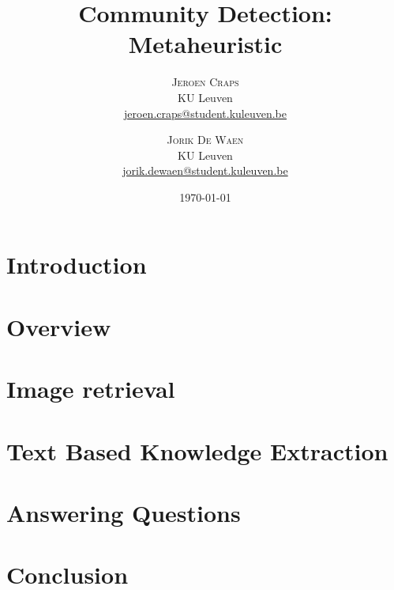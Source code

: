 \documentclass[twoside,twocolumn]{article}
\title{Community Detection: Metaheuristic} %
\author{%
\textsc{Jeroen Craps} \\[1ex] %
\normalsize KU Leuven \\ %
\normalsize \href{mailto:jeroen.craps@student.kuleuven.be}{jeroen.craps@student.kuleuven.be} %
\and %
\textsc{Jorik De Waen} \\[1ex] %
\normalsize KU Leuven \\ %
\normalsize \href{mailto:jorik.dewaen@student.kuleuven.be}{jorik.dewaen@student.kuleuven.be} %
}
\date{\today} %
\begin{document}



\section{Introduction}




\section{Overview}




\section{Image retrieval}



\section{Text Based Knowledge Extraction}



\section{Answering Questions}




\section{Conclusion}







\end{document}
